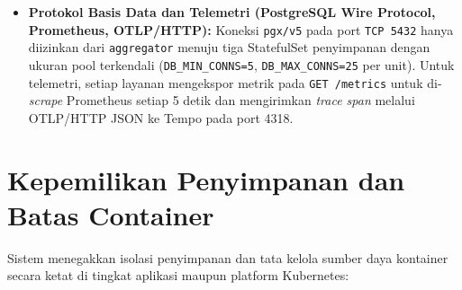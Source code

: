 \begin{itemize}
\begin{enumerate}
    \end{enumerate}
    \item \textbf{Protokol Basis Data dan Telemetri (PostgreSQL Wire Protocol, Prometheus, OTLP/HTTP):} Koneksi \texttt{pgx/v5} pada port \texttt{TCP 5432} hanya diizinkan dari \texttt{aggregator} menuju tiga StatefulSet penyimpanan dengan ukuran pool terkendali (\texttt{DB\_MIN\_CONNS=5}, \texttt{DB\_MAX\_CONNS=25} per unit). Untuk telemetri, setiap layanan mengekspor metrik pada \texttt{GET /metrics} untuk di-\textit{scrape} Prometheus setiap 5 detik dan mengirimkan \textit{trace span} melalui OTLP/HTTP JSON ke Tempo pada port 4318.
\end{itemize}


\section{Kepemilikan Penyimpanan dan Batas Container}
Sistem menegakkan isolasi penyimpanan dan tata kelola sumber daya kontainer secara ketat di tingkat aplikasi maupun platform Kubernetes:

